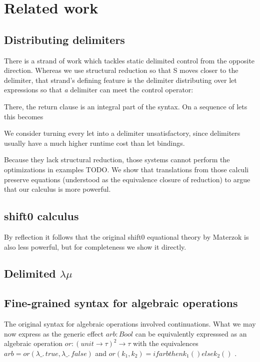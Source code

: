 \documentclass[a4paper, 11pt,titlepage, openright, twoside]{report}
\newcommand{\+}{\enspace}
\begin{document}
\chapter{Related work}


\section*{Distributing delimiters}
There is a strand of work which tackles static delimited control from the opposite direction.
Whereas we use structural reduction so that S moves closer to the delimiter, that strand's defining feature is
the delimiter distributing over let expressions so that \textit{a} delimiter can meet the control operator:

There, the return clause is an integral part of the syntax. On a sequence of lets this becomes

We consider turning every let into a delimiter unsatisfactory, since delimiters usually have a much higher runtime cost than let bindings.

Because they lack structural reduction, those systems cannot perform the optimizations in examples TODO.
We show that translations from those calculi preserve equations (understood as the equivalence closure of reduction)
to argue that our calculus is more powerful.

\section*{shift0 calculus}
By reflection\cite{ppdp21} it follows that the original shift0 equational theory by Materzok is also less powerful,
but for completeness we show it directly.

\section*{Delimited $λμ$}

\section*{Fine-grained syntax for algebraic operations}
The original syntax for algebraic operations involved continuations.
What we may now express as the generic effect $arb : Bool$
can be equivalently expresssed as an algebraic operation $or : (unit → τ)^2 → τ$
with the equivalences $arb = or(λ\_.\,true, λ\_.\,false)$ and
$or(k_1,k_2) = if arb then k_1 () else k_2 ()$ \cite{alggen}.
\end{document}
